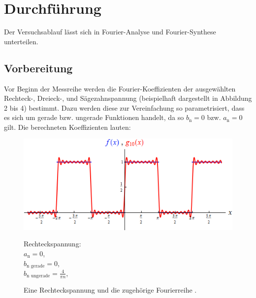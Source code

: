 \section{Durchführung}
\label{sec:Durchführung}
Der Versuchsablauf lässt sich in Fourier-Analyse und Fourier-Synthese unterteilen.

\subsection{Vorbereitung}
Vor Beginn der Messreihe werden die Fourier-Koeffizienten der ausgewählten Rechteck-,
Dreieck-, und Sägezahnspannung (beispielhaft dargestellt in Abbildung 2 bis 4) bestimmt. Dazu werden diese zur Vereinfachung so parametrisiert,
dass es sich um gerade bzw. ungerade Funktionen handelt, da so $b_\text{n} = 0$ bzw.
$a_\text{n} = 0$ gilt. Die berechneten Koeffizienten lauten:

\begin{figure}[H]
\hspace{73pt}
\begin{minipage}[t]{6cm}
\vspace{0pt}
\centering
\includegraphics[scale=0.5]{vorb1.png}
\caption{Eine Rechteckspannung und die zugehörige Fourierreihe \cite{sample2}.}
\label{fig:vorb1}
\end{minipage}
\hfill
\hspace{73pt}
\begin{minipage}[t]{6cm}
\vspace{0pt}
Rechteckspannung: \\
$a_\text{n} = 0$, \\
$b_\text{n gerade} = 0$, \\
$b_\text{n ungerade} = \frac{4}{\pi n}$,
\end{minipage}
\end{figure}


